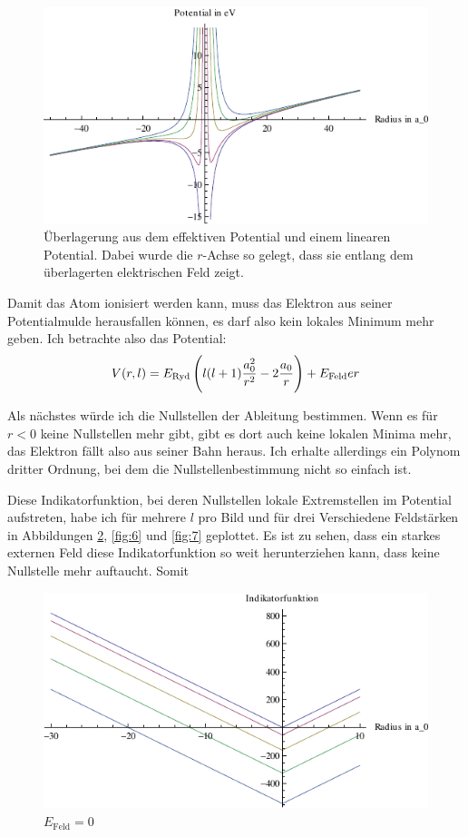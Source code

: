 \begin{figure}
	\centering
	\includegraphics[width=\textwidth]{3-Ueberlagerung.pdf}
	\caption{%
		Überlagerung aus dem effektiven Potential und einem linearen Potential.
		Dabei wurde die $r$-Achse so gelegt, dass sie entlang dem überlagerten
		elektrischen Feld zeigt.
	}
	\label{fig:3}
\end{figure}

Damit das Atom ionisiert werden kann, muss das Elektron aus seiner
Potentialmulde herausfallen können, es darf also kein lokales Minimum mehr
geben. Ich betrachte also das Potential:
\[
	V(r, l) = E_\text{Ryd} \del{l(l+1) \frac{a_0^2}{r^2} - 2 \frac{a_0}r} + E_\text{Feld} e r
\]

Als nächstes würde ich die Nullstellen der Ableitung bestimmen. Wenn es für $r
< 0$ keine Nullstellen mehr gibt, gibt es dort auch keine lokalen Minima mehr,
das Elektron fällt also aus seiner Bahn heraus. Ich erhalte allerdings ein Polynom dritter Ordnung, bei dem die Nullstellenbestimmung nicht so einfach ist.

Diese Indikatorfunktion, bei deren Nullstellen lokale Extremstellen im Potential aufstreten, habe ich für mehrere $l$ pro Bild und für drei Verschiedene Feldstärken in Abbildungen \ref{fig:5}, \ref{fig:6} und \ref{fig:7} geplottet. Es ist zu sehen, dass ein starkes externen Feld diese Indikatorfunktion so weit herunterziehen kann, dass keine Nullstelle mehr auftaucht. Somit 

\begin{figure}
		\centering
		\includegraphics[width=\textwidth]{3-Indikator-000.pdf}
		\caption{$E_\text{Feld} = 0$}
		\label{fig:5}
\end{figure}

